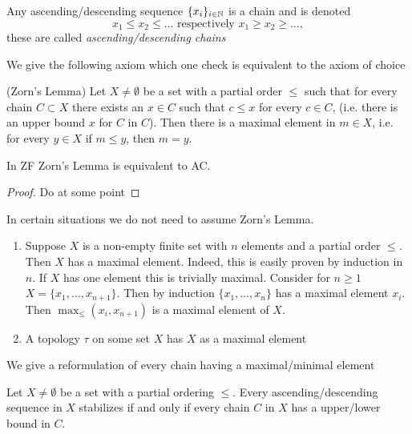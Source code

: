 \begin{remark}
    Any ascending/descending sequence $\{x_i\}_{i\in \mathbb{N}}$ is a chain and is denoted 
    $$x_1\leq x_2\leq \dots \text{ respectively } x_1\geq x_2 \geq \dots,$$
    these are called \textit{ascending/descending chains}
\end{remark}
We give the following axiom which one check is equivalent to the axiom of choice 
\begin{axioms}\label{ZornsLemma}(Zorn's Lemma)
    Let $X\neq \emptyset$ be a set with a partial order $\leq$ such that for every chain $C\subset X$ there exists an $x\in C$ such that $c\leq x$ for every $c\in C$, (i.e. there is an upper bound $x$ for $C$ in $C$). Then there is a maximal element in $m \in X$, i.e. for every $y \in X$ if $m\leq y$, then $m=y$.
\end{axioms}
\begin{theorem}
    In ZF Zorn's Lemma is equivalent to AC.
\end{theorem}
\begin{proof}
    {\Large Do at some point}
\end{proof}
\begin{example}
    In certain situations we do not need to assume Zorn's Lemma. 
    \begin{enumerate}
        \item Suppose $X$ is a non-empty finite set with $n$ elements and a partial order $\leq$. Then $X$ has a maximal element. Indeed, this is easily proven by induction in $n$. If $X$ has one element this is trivially maximal. Consider for $n\geq1$ $X= \{x_1,\dots,x_{n+1}\}$. Then by induction $\{x_1,\dots,x_n\}$ has a maximal element $x_i$. Then $\max_\leq(x_i,x_{n+1})$ is a maximal element of $X$. 
        \item A topology $\tau$ on some set $X$ has $X$ as a maximal element
    \end{enumerate}
     
\end{example}
We give a reformulation of every chain having a maximal/minimal element
\begin{lemma}\label{MaximalMinimalIsEquivalentToAscendingDescendingChainCondition}
    Let $X\neq \emptyset$ be a set with a partial ordering $\leq$. Every ascending/descending sequence in $X$ stabilizes if and only if every chain $C$ in $X$ has a upper/lower bound in $C$.
\end{lemma}
